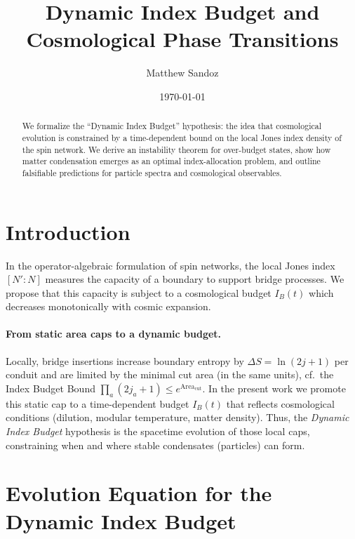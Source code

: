 \documentclass[11pt]{article}
\title{Dynamic Index Budget and Cosmological Phase Transitions}
\author{Matthew Sandoz}
\date{\today}
\theoremstyle{plain}
\theoremstyle{definition}
\begin{document}
\maketitle
\begin{abstract}
  We formalize the ``Dynamic Index Budget'' hypothesis: the idea that cosmological evolution is constrained by a time-dependent bound on the local Jones index density of the spin network. We derive an instability theorem for over-budget states, show how matter condensation emerges as an optimal index-allocation problem, and outline falsifiable predictions for particle spectra and cosmological observables.
\end{abstract}

\section{Introduction}
In the operator-algebraic formulation of spin networks, the local Jones index $[N':N]$ measures the capacity of a boundary to support bridge processes. We propose that this capacity is subject to a cosmological budget $I_B(t)$ which decreases monotonically with cosmic expansion.

\paragraph{From static area caps to a dynamic budget.}
Locally, bridge insertions increase boundary entropy by $\Delta S=\ln(2j+1)$ per conduit and are limited by the minimal cut area (in the same units), cf.\ the Index Budget Bound $\prod_a(2j_a+1)\le e^{\mathrm{Area}_{\mathrm{cut}}}$.
In the present work we promote this static cap to a time-dependent budget $I_B(t)$ that reflects cosmological conditions (dilution, modular temperature, matter density). Thus, the \emph{Dynamic Index Budget} hypothesis is the spacetime evolution of those local caps, constraining when and where stable condensates (particles) can form.

\section{Evolution Equation for the Dynamic Index Budget}\label{sec:budget-evolution}
\end{document}
